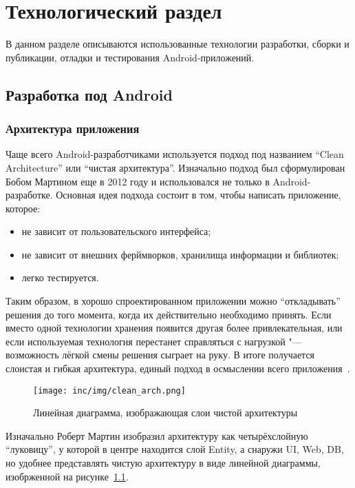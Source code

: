 \chapter{Технологический раздел}
\label{ch:tech}
В данном разделе описываются использованные технологии разработки, сборки и публикации, отладки и тестирования Android-приложений.

\section{Разработка под Android}
\label{sec:dev}

\subsection{Архитектура приложения}
\label{subsec:arch}

Чаще всего Android-разработчиками используется подход под названием ``Clean Architecture'' или ``чистая архитектура''.
Изначально подход был сформулирован Бобом Мартином еще в 2012 году\cite{martin:clean} и использовался не только в Android-разработке.
Основная идея подхода состоит в том, чтобы написать приложение, которое:
\begin{itemize}
  \item не зависит от пользовательского интерфейса;
  \item не зависит от внешних ферймворков, хранилища информации и библиотек;
  \item легко тестируется.
\end{itemize}

Таким образом, в хорошо спроектированном приложении можно ``откладывать'' решения до того момента, когда их действительно необходимо принять.
Если вместо одной технологии хранения появится другая более привлекательная, или если используемая технология перестанет справляться с нагрузкой "--- возможность лёгкой смены решения сыграет на руку.
В итоге получается слоистая и гибкая архитектура, единый подход в осмыслении всего приложения~\cite{gihub:androidArch}.

\begin{figure}[ht]
  \centering
  \texttt{[image: inc/img/clean\_arch.png]}
  \caption{Линейная диаграмма, изображающая слои чистой архитектуры}
  \label{fig:cleanArch}
\end{figure}

Изначально Роберт Мартин изобразил архитектуру как четырёхслойную ``луковицу'', у которой в центре находится слой Entity, а снаружи UI, Web, DB, но удобнее представлять чистую архитектуру в виде линейной диаграммы, изобрженной на рисунке~\ref{fig:cleanArch}.

